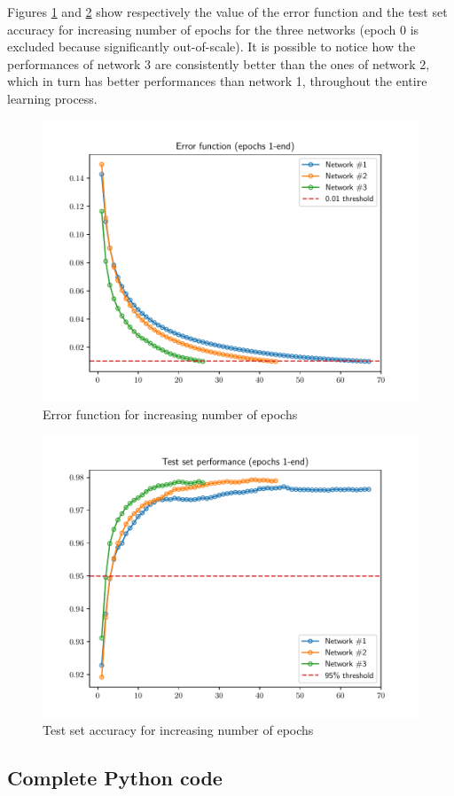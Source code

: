 \documentclass[letterpaper,headings=standardclasses]{scrartcl}
\begin{document}
Figures \ref{errors_plot} and \ref{tests_plot} show respectively the value of the error function and the test set accuracy for increasing number of epochs for the three networks (epoch 0 is excluded because significantly out-of-scale). It is possible to notice how the performances of network 3 are consistently better than the ones of network 2, which in turn has better performances than network 1, throughout the entire learning process.

\begin{figure}[H]
    \centering
    \includegraphics[width=.7\linewidth]{errors.pdf}
    \caption{Error function for increasing number of epochs}
    \label{errors_plot}
\end{figure}

\begin{figure}[H]
    \centering
    \includegraphics[width=.7\linewidth]{tests.pdf}
    \caption{Test set accuracy for increasing number of epochs}
    \label{tests_plot}
\end{figure}

\subsection{Complete Python code}
\end{document}
